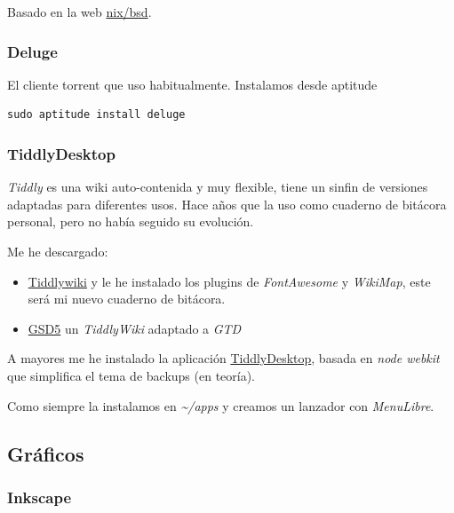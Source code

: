 \documentclass[12pt,spanish,]{scrartcl}
\providecommand{\tightlist}{%
  \setlength{\itemsep}{0pt}\setlength{\parskip}{0pt}}
\begin{document}
Basado en la web
\href{https://nixbsd.wordpress.com/2017/04/01/freebsd-10-2-configure-openvpn-client/}{nix/bsd}.

\hypertarget{deluge}{%
\subsubsection{Deluge}\label{deluge}}

El cliente torrent que uso habitualmente. Instalamos desde aptitude

\begin{verbatim}
sudo aptitude install deluge
\end{verbatim}

\hypertarget{tiddlydesktop}{%
\subsubsection{TiddlyDesktop}\label{tiddlydesktop}}

\emph{Tiddly} es una wiki auto-contenida y muy flexible, tiene un sinfin
de versiones adaptadas para diferentes usos. Hace años que la uso como
cuaderno de bitácora personal, pero no había seguido su evolución.

Me he descargado:

\begin{itemize}
\tightlist
\item
  \href{http://tiddlywiki.com/}{Tiddlywiki} y le he instalado los
  plugins de \emph{FontAwesome} y \emph{WikiMap}, este será mi nuevo
  cuaderno de bitácora.
\item
  \href{http://gsd5.tiddlyspot.com/}{GSD5} un \emph{TiddlyWiki} adaptado
  a \emph{GTD}
\end{itemize}

A mayores me he instalado la aplicación
\href{https://github.com/Jermolene/TiddlyDesktop}{TiddlyDesktop}, basada
en \emph{node webkit} que simplifica el tema de backups (en teoría).

Como siempre la instalamos en \emph{\textasciitilde{}/apps} y creamos un
lanzador con \emph{MenuLibre}.

\hypertarget{gruxe1ficos}{%
\subsection{Gráficos}\label{gruxe1ficos}}

\hypertarget{inkscape}{%
\subsubsection{Inkscape}\label{inkscape}}
\end{document}
